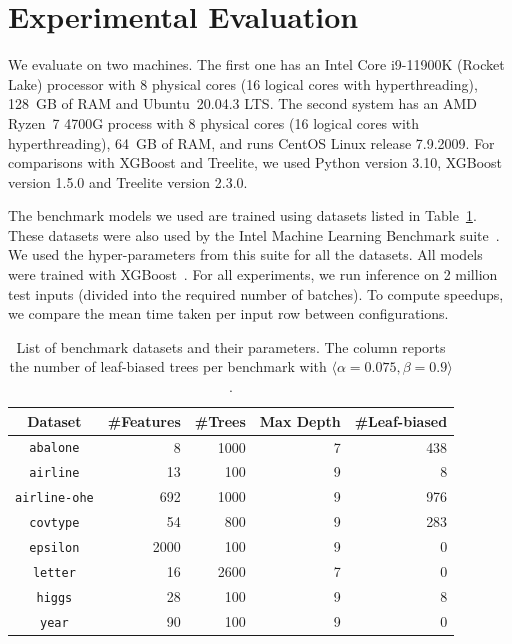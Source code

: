 \section{Experimental Evaluation}
\label{sec:evaluation}

We evaluate \Treebeard{} on two machines. The first one has an Intel Core
i9-11900K (Rocket Lake) processor with 8 physical cores (16 logical cores with
hyperthreading), 128~GB of RAM and Ubuntu~20.04.3 LTS.  The second system has an
AMD Ryzen~7 4700G process with 8 physical cores (16 logical cores with
hyperthreading), 64~GB of RAM, and runs CentOS Linux release 7.9.2009. For
comparisons with XGBoost and Treelite, we used Python version 3.10, XGBoost
version 1.5.0 and Treelite version 2.3.0.


The benchmark models we used are trained using datasets listed in Table~\ref{Tab:Benchmarks}. These datasets were also used by the Intel Machine Learning
Benchmark suite~\cite{MLBenchmarks}. We used
the hyper-parameters from this suite for all the datasets. All models were trained
with XGBoost~\cite{XGBoost}.  For all experiments, we run inference on 2 million test
inputs (divided into the required number of batches). To compute speedups, we
compare the mean time taken per input row between configurations.

\begin{table}
  \centering
  \small{
  \begin{tabularx}{\linewidth}{c r r r r}
   \toprule
   \textbf{Dataset} & \textbf{\#Features} & \textbf{\#Trees} & \textbf{Max Depth} & \textbf{\#Leaf-biased}\\
   \midrule
   \texttt{abalone} & 8 & 1000 & 7 & 438\\
   \texttt{airline} & 13 & 100 & 9 & 8 \\
   \texttt{airline-ohe} & 692 & 1000 & 9 & 976 \\
   \texttt{covtype} & 54 & 800 & 9 & 283\\
   \texttt{epsilon} & 2000 & 100 & 9 & 0\\
   \texttt{letter} & 16 & 2600 & 7 & 0 \\
   \texttt{higgs} & 28 & 100 & 9 & 8\\
   \texttt{year} & 90 & 100 & 9 & 0\\
   \bottomrule
  \end{tabularx}
  \vskip 5pt
  \caption{\label{Tab:Benchmarks}List of benchmark datasets and their 
  parameters. 
  The column  reports the number of leaf-biased trees per benchmark with $\langle\alpha =0.075, \beta =0.9 \rangle$ . }
  }
\end{table}

